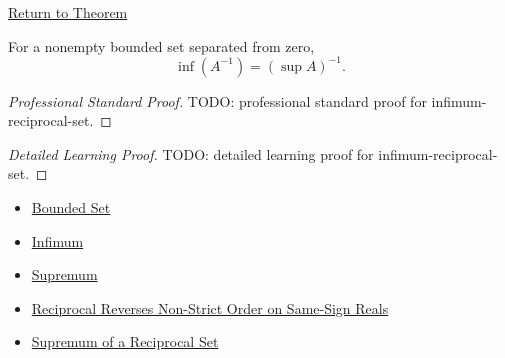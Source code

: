 \newpage
{}
\label{prf:infimum-reciprocal-set}

\begin{remark*}[Return]
\hyperref[thm:infimum-reciprocal-set]{Return to Theorem}
\end{remark*}

\begin{theorem*}
For a nonempty bounded set separated from zero,
\[
  \inf(A^{-1})=(\sup A)^{-1}.
\]
\end{theorem*}

\begin{proof}[Professional Standard Proof]
\LRAProofBodyStart
TODO: professional standard proof for infimum-reciprocal-set.
\end{proof}

\begin{proof}[Detailed Learning Proof]
\LRAProofBodyStart
TODO: detailed learning proof for infimum-reciprocal-set.
\end{proof}

\begin{remark*}
\end{remark*}

\begin{dependencies}
\begin{itemize}
  \item \hyperref[def:bounded]{Bounded Set}
  \item \hyperref[def:infimum]{Infimum}
  \item \hyperref[def:supremum]{Supremum}
  \item \hyperref[thm:reciprocal-reverses-nonstrict-order-on-same-sign-r]{Reciprocal Reverses Non-Strict Order on Same-Sign Reals}
  \item \hyperref[thm:supremum-reciprocal-set]{Supremum of a Reciprocal Set}
\end{itemize}
\end{dependencies}

\clearpage
